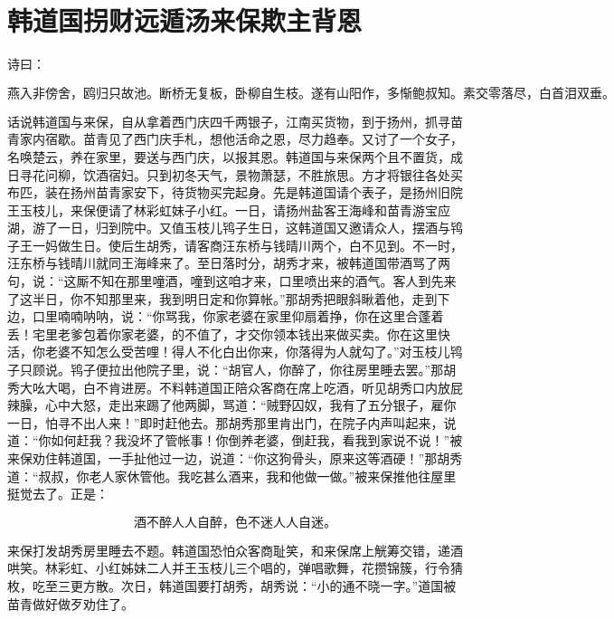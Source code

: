 

\chapter{韩道国拐财远遁\KG 汤来保欺主背恩}


诗曰：

\[
燕入非傍舍，鸥归只故池。断桥无复板，卧柳自生枝。
遂有山阳作，多惭鲍叔知。素交零落尽，白首泪双垂。
\]

话说韩道国与来保，自从拿着西门庆四千两银子，江南买货物，到于扬州，抓寻苗青家内宿歇。苗青见了西门庆手札，想他活命之恩，尽力趋奉。又讨了一个女子，名唤楚云，养在家里，要送与西门庆，以报其恩。韩道国与来保两个且不置货，成日寻花问柳，饮酒宿妇。只到初冬天气，景物萧瑟，不胜旅思。方才将银往各处买布匹，装在扬州苗青家安下，待货物买完起身。先是韩道国请个表子，是扬州旧院王玉枝儿，来保便请了林彩虹妹子小红。一日，请扬州盐客王海峰和苗青游宝应湖，游了一日，归到院中。又值玉枝儿鸨子生日，这韩道国又邀请众人，摆酒与鸨子王一妈做生日。使后生胡秀，请客商汪东桥与钱晴川两个，白不见到。不一时，汪东桥与钱晴川就同王海峰来了。至日落时分，胡秀才来，被韩道国带酒骂了两句，说：“这厮不知在那里噇酒，噇到这咱才来，口里喷出来的酒气。客人到先来了这半日，你不知那里来，我到明日定和你算帐。”那胡秀把眼斜瞅着他，走到下边，口里喃喃呐呐，说：“你骂我，你家老婆在家里仰扇着挣，你在这里合蓬着丢！宅里老爹包着你家老婆，的不值了，才交你领本钱出来做买卖。你在这里快活，你老婆不知怎么受苦哩！得人不化白出你来，你落得为人就勾了。”对玉枝儿鸨子只顾说。鸨子便拉出他院子里，说：“胡官人，你醉了，你往房里睡去罢。”那胡秀大吆大喝，白不肯进房。不料韩道国正陪众客商在席上吃酒，听见胡秀口内放屁辣臊，心中大怒，走出来踢了他两脚，骂道：“贼野囚奴，我有了五分银子，雇你一日，怕寻不出人来！”即时赶他去。那胡秀那里肯出门，在院子内声叫起来，说道：“你如何赶我？我没坏了管帐事！你倒养老婆，倒赶我，看我到家说不说！”被来保劝住韩道国，一手扯他过一边，说道：“你这狗骨头，原来这等酒硬！”那胡秀道：“叔叔，你老人家休管他。我吃甚么酒来，我和他做一做。”被来保推他往屋里挺觉去了。正是：

\[
酒不醉人人自醉，色不迷人人自迷。
\]

来保打发胡秀房里睡去不题。韩道国恐怕众客商耻笑，和来保席上觥筹交错，递酒哄笑。林彩虹、小红姊妹二人并王玉枝儿三个唱的，弹唱歌舞，花攒锦簇，行令猜枚，吃至三更方散。次日，韩道国要打胡秀，胡秀说：“小的通不晓一字。”道国被苗青做好做歹劝住了。

